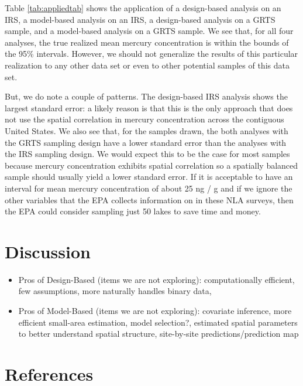 \documentclass[]{elsarticle} %
\begin{document}
Table \ref{tab:appliedtab} shows the application of a design-based
analysis on an IRS, a model-based analysis on an IRS, a design-based
analysis on a GRTS sample, and a model-based analysis on a GRTS sample.
We see that, for all four analyses, the true realized mean mercury
concentration is within the bounds of the 95\% intervals. However, we
should not generalize the results of this particular realization to any
other data set or even to other potential samples of this data set.

But, we do note a couple of patterns. The design-based IRS analysis
shows the largest standard error: a likely reason is that this is the
only approach that does not use the spatial correlation in mercury
concentration across the contiguous United States. We also see that, for
the samples drawn, the both analyses with the GRTS sampling design have
a lower standard error than the analyses with the IRS sampling design.
We would expect this to be the case for most samples because mercury
concentration exhibits spatial correlation so a spatially balanced
sample should usually yield a lower standard error. If it is acceptable
to have an interval for mean mercury concentration of about 25 ng / g
and if we ignore the other variables that the EPA collects information
on in these NLA surveys, then the EPA could consider sampling just 50
lakes to save time and money.

\hypertarget{sec:discussion}{%
\section{Discussion}\label{sec:discussion}}

\begin{itemize}
\item
  Pros of Design-Based (items we are not exploring): computationally
  efficient, few assumptions, more naturally handles binary data,
\item
  Pros of Model-Based (items we are not exploring): covariate inference,
  more efficient small-area estimation, model selection?, estimated
  spatial parameters to better understand spatial structure,
  site-by-site predictions/prediction map
\end{itemize}

\hypertarget{references}{%
\section*{References}\label{references}}
\end{document}
